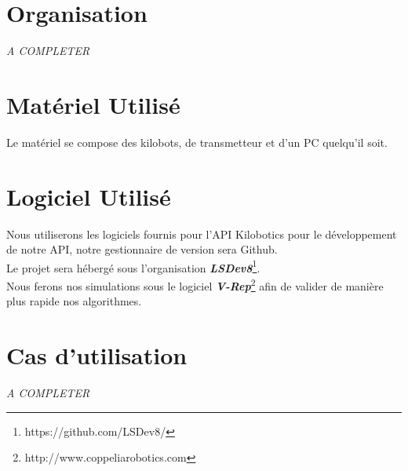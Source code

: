 \documentclass[a4paper,8pt]{report}
\begin{document}
\medskip
\section*{Organisation}\label{sec:name}

\textit{A COMPLETER}

\section*{Mat\'eriel Utilis\'e}\label{sec:name}

Le mat\'eriel se compose des kilobots, de transmetteur et d'un PC quelqu'il soit.

\section*{Logiciel Utilis\'e}\label{sec:name}

Nous utiliserons les logiciels fournis pour l'API Kilobotics pour le d\'eveloppement de notre API, notre gestionnaire de version sera Github.\\
Le projet sera h\'eberg\'e sous l'organisation \textit{\textbf{LSDev8}}\footnote{https://github.com/LSDev8/}.\\
Nous ferons nos simulations sous le logiciel \textit{\textbf{V-Rep}}\footnote{http://www.coppeliarobotics.com} afin de valider de mani\`ere plus rapide nos algorithmes.\\

\section*{Cas d'utilisation}\label{sec:name}

\textit{A COMPLETER}
\end{document}

